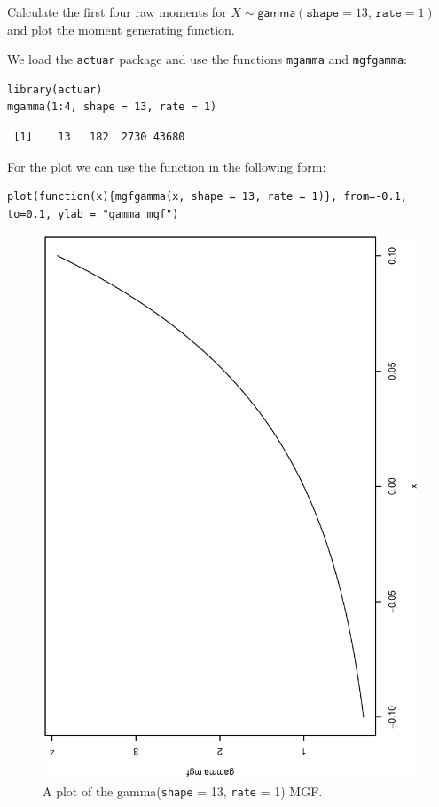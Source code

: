 \documentclass[captions=tableheading]{scrbook}
\begin{document}
\begin{example}
Calculate the first four raw moments for \(X\sim\mathsf{gamma}(\mathtt{shape}=13,\,\mathtt{rate}=1)\) and plot the moment generating function.

We load the \texttt{actuar} package and use the functions \texttt{mgamma} and \texttt{mgfgamma}:

\begin{verbatim}
library(actuar)
mgamma(1:4, shape = 13, rate = 1)
\end{verbatim}

\begin{verbatim}
 [1]    13   182  2730 43680
\end{verbatim}

For the plot we can use the function in the following form:


\begin{verbatim}
plot(function(x){mgfgamma(x, shape = 13, rate = 1)}, from=-0.1, to=0.1, ylab = "gamma mgf")
\end{verbatim}





\begin{figure}[th]
  \includegraphics[angle=270, totalheight=4in]{ps/contdist/gamma-mgf.ps}
  \caption[Plot of the \textsf{gamma}(\texttt{shape} = 13, \texttt{rate} = 1) MGF]{\small A plot of the \textsf{gamma}(\texttt{shape} = 13, \texttt{rate} = 1) MGF.}
  \label{fig-gamma-mgf}
\end{figure}



\end{example}
\end{document}
